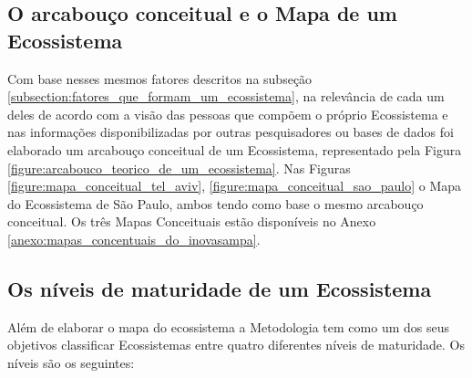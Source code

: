 \subsection{O arcabouço conceitual e o Mapa de um Ecossistema}
\label{subsection:arcabouco_conceitual_e_modelo}

Com base nesses mesmos fatores descritos na subseção \ref{subsection:fatores_que_formam_um_ecossistema}, na relevância de cada um deles de acordo com a visão das pessoas que compõem o próprio Ecossistema e nas informações disponibilizadas por outras pesquisadores ou bases de dados foi elaborado um arcabouço conceitual de um Ecossistema, representado pela Figura \ref{figure:arcabouco_teorico_de_um_ecossistema}. Nas Figuras \ref{figure:mapa_conceitual_tel_aviv}, \ref{figure:mapa_conceitual_sao_paulo} o Mapa do Ecossistema de São Paulo, ambos tendo como base o mesmo arcabouço conceitual. Os três Mapas Conceituais estão disponíveis no Anexo \ref{anexo:mapas_concentuais_do_inovasampa}.

\subsection{Os níveis de maturidade de um Ecossistema}
\label{subsection:niveis_de_maturidade_de_um_ecossistema}

Além de elaborar o mapa do ecossistema a Metodologia tem como um dos seus objetivos classificar Ecossistemas entre quatro diferentes níveis de maturidade. Os níveis são os seguintes:

